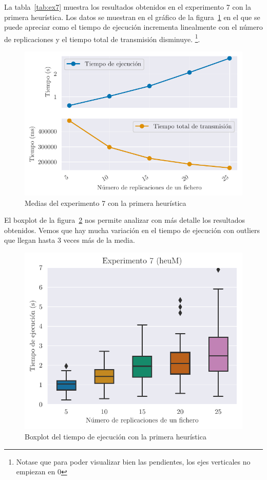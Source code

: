 La tabla~\ref{tab:ex7} muestra los resultados obtenidos en el experimento 7 con la primera heurística. Los
datos se muestran en el gráfico de la figura~\ref{fig:ex7means} en el que se puede apreciar como el tiempo
de ejecución incrementa linealmente con el número de replicaciones y el tiempo total de transmisión disminuye.
\footnote{Notase que para poder visualizar bien las pendientes, los ejes verticales no empiezan en 0}.

\begin{figure}[H]
    \centering
    \includegraphics{include/plots/ex7_means.pdf}
    \caption{Medias del experimento 7 con la primera heurística}%
    \label{fig:ex7means}
\end{figure}

El boxplot de la figura~\ref{fig:ex7time} nos permite analizar con más detalle los resultados obtenidos.
Vemos que hay mucha variación en el tiempo de ejecución con outliers que llegan hasta 3 veces más de la media.

\begin{figure}[H]
    \centering
    \includegraphics{include/plots/ex7_time_bplot.pdf}
    \caption{Boxplot del tiempo de ejecución con la primera heurística}%
    \label{fig:ex7time}
\end{figure}

